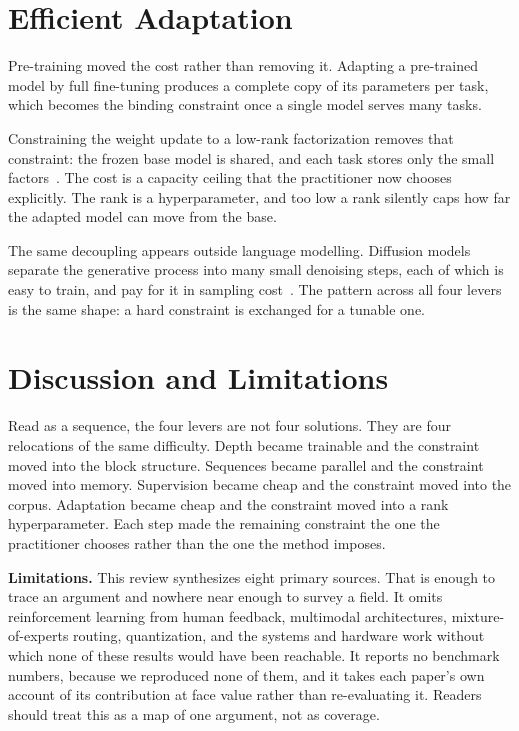 \documentclass[conference]{IEEEtran}
\begin{document}
\section{Efficient Adaptation}
\label{sec:adaptation}

Pre-training moved the cost rather than removing it. Adapting a pre-trained
model by full fine-tuning produces a complete copy of its parameters per task,
which becomes the binding constraint once a single model serves many tasks.

Constraining the weight update to a low-rank factorization removes that
constraint: the frozen base model is shared, and each task stores only the small
factors~\cite{hu2021loralowrankadaptationlarge}. The cost is a capacity ceiling
that the practitioner now chooses explicitly. The rank is a hyperparameter, and
too low a rank silently caps how far the adapted model can move from the base.

The same decoupling appears outside language modelling. Diffusion models
separate the generative process into many small denoising steps, each of which
is easy to train, and pay for it in sampling
cost~\cite{ho2020denoisingdiffusionprobabilisticmodels}. The pattern across all
four levers is the same shape: a hard constraint is exchanged for a tunable one.

\section{Discussion and Limitations}
\label{sec:limitations}

Read as a sequence, the four levers are not four solutions. They are four
relocations of the same difficulty. Depth became trainable and the constraint
moved into the block structure. Sequences became parallel and the constraint
moved into memory. Supervision became cheap and the constraint moved into the
corpus. Adaptation became cheap and the constraint moved into a rank
hyperparameter. Each step made the remaining constraint the one the
practitioner chooses rather than the one the method imposes.

\textbf{Limitations.} This review synthesizes eight primary sources. That is
enough to trace an argument and nowhere near enough to survey a field. It omits
reinforcement learning from human feedback, multimodal architectures,
mixture-of-experts routing, quantization, and the systems and hardware work
without which none of these results would have been reachable. It reports no
benchmark numbers, because we reproduced none of them, and it takes each paper's
own account of its contribution at face value rather than re-evaluating it.
Readers should treat this as a map of one argument, not as coverage.


\label{sec:bib}

\end{document}
